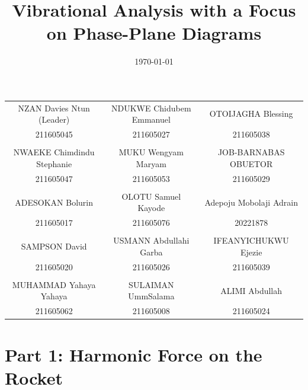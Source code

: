 \documentclass[12pt,a4paper]{article}
\title{\textbf{Vibrational Analysis with a Focus on Phase-Plane Diagrams}}
\date{\today}
\begin{document}
\maketitle

\begin{center}
    \begin{tabular}{c c c}
        NZAN Davies Ntun (Leader) & NDUKWE Chidubem Emmanuel & OTOIJAGHA Blessing \\
        211605045 & 211605027 & 211605038 \\
        & & \\
        NWAEKE Chimdindu Stephanie & MUKU Wengyam Maryam & JOB-BARNABAS OBUETOR \\
        211605047 & 211605053 & 211605029 \\
        & & \\
        ADESOKAN Bolurin & OLOTU Samuel Kayode & Adepoju Mobolaji Adrain \\
        211605017 & 211605076 & 20221878 \\
        & & \\
        SAMPSON David & USMANN Abdullahi Garba & IFEANYICHUKWU Ejezie \\
        211605020 & 211605026 & 211605039 \\
        & & \\
        MUHAMMAD Yahaya Yahaya & SULAIMAN UmmSalama & ALIMI Abdullah \\
        211605062 & 211605008 & 211605024 \\
    \end{tabular}
\end{center}

\newpage
\vspace*{2cm}
\tableofcontents
\newpage

\section{Part 1: Harmonic Force on the Rocket}
\end{document}
